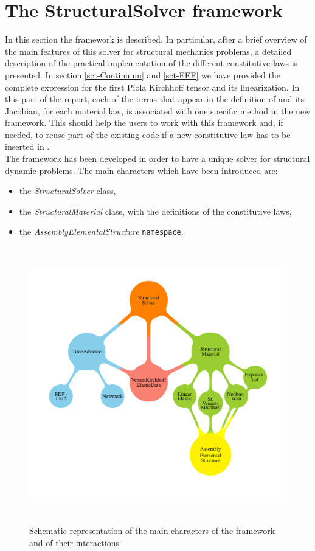 \section{The StructuralSolver framework}
In this section the \SSol{}
framework is described. In particular, after a brief overview of the
main features of this solver for structural mechanics problems, a
detailed description of the practical implementation of the different
constitutive laws is presented. In section \ref{sct-Continuum} and
\ref{sct-FEF} we have provided the complete expression for the first
Piola Kirchhoff tensor and its linearization. In this part of the
report, each of the terms that appear in the definition of \Piola and
its Jacobian, for each material law, is associated with one specific
method in the new \SSolNC{} framework. This should help the users to
work with this framework and, if needed, to reuse part of the existing
code if a new constitutive law has to be inserted in \LV.\\ The
\SSolNC{} framework has been developed in order to have a unique solver
for structural dynamic problems. The main characters which have been
introduced are:
\begin{itemize}
\item the \textit{StructuralSolver} class,
\item the \textit{StructuralMaterial} class, with the definitions of
  the constitutive laws,
\item the \textit{AssemblyElementalStructure} \texttt{namespace}.
\end{itemize}

\begin{figure}[h!]  \centering
  \includegraphics[width=14cm,height=12cm]{images/DesignStructural.pdf}
  \caption{Schematic representation of the main characters of the
    \SSol{} framework and of their interactions}
  \label{fig::design}
\end{figure}
